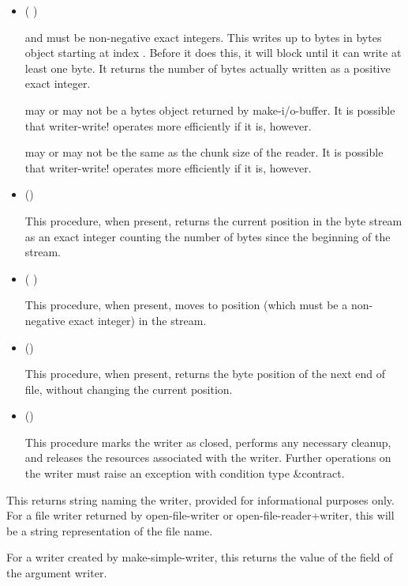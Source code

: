\begin{entry}{%
}
\begin{itemize}
\item {\cf (   )}
   
   and  must be non-negative exact integers.
  This writes up to  bytes in bytes object 
  starting at index . Before it does this, it will block
  until it can write at least one byte. It returns the number of bytes
  actually written as a positive exact integer.
  
   may or may not be a bytes object returned by {\cf
    make-i/o-buffer}. It is possible that {\cf writer-write!} operates more
  efficiently if it is, however.
  
   may or may not be the same as the chunk size of the
  reader. It is possible that {\cf writer-write!} operates more
  efficiently if it is, however.

\item {\cf ()}
   
  This procedure, when present, returns the current position in the byte
  stream as an exact integer counting the number of bytes since the
  beginning of the stream.
   
\item {\cf ( )}
   
  This procedure, when present, moves to position  (which must be a
  non-negative exact integer) in the stream.
  
\item {\cf ()}
   
    This procedure, when present, returns the byte position of the next end
    of file, without changing the current position.
   
\item {\cf ()}
  
  This procedure marks the writer as closed, performs any necessary
  cleanup, and releases the resources associated with the writer. Further
  operations on the writer must raise an exception with condition type
  {\cf\&contract}.
\end{itemize}
\end{entry}

\begin{entry}{%
}
   
This returns string naming the writer, provided for informational
purposes only. For a file writer returned by {\cf open-file-writer}
or {\cf open-file-reader+writer}, this will be a string
representation of the file name.
   
For a writer created by {\cf make-simple-writer}, this returns the
value of the  field of the argument writer.
\end{entry}

